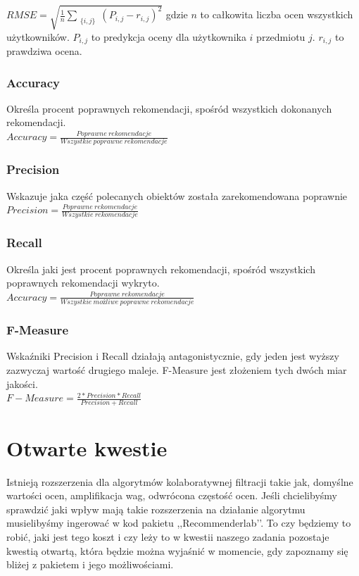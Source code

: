 \documentclass[12pt, a4paper]{article}
\begin{document}
\begin{math}
RMSE = \sqrt{
        \frac{1}{n} \sum_{ \substack{
                \{i,j\}
        } }
        (P_{i,j} - r_{i,j})^2
}
\end{math}
gdzie $n$ to całkowita liczba ocen wszystkich użytkowników. $P_{i,j}$ to predykcja oceny
dla użytkownika $i$ przedmiotu $j$. $r_{i,j}$ to prawdziwa ocena.

\subsubsection{Accuracy}
Określa procent poprawnych rekomendacji, spośród wszystkich dokonanych rekomendacji.\\
$Accuracy = \frac{Poprawne\:rekomendacje}{Wszystkie \:poprawne\: rekomendacje}$
\subsubsection{Precision}
Wskazuje jaka część polecanych obiektów została zarekomendowana poprawnie\\
$Precision = \frac{Poprawne \:rekomendacje}{Wszystkie\: rekomendacje}$
\subsubsection{Recall}
Określa jaki jest procent poprawnych rekomendacji, spośród wszystkich poprawnych rekomendacji wykryto.\\
$Accuracy = \frac{Poprawne\:rekomendacje}{Wszystkie \:możliwe \:poprawne\: rekomendacje}$
\subsubsection{F-Measure}
Wskaźniki Precision i Recall działają antagonistycznie, gdy jeden jest wyższy zazwyczaj wartość drugiego maleje. F-Measure jest złożeniem tych dwóch miar jakości.\\
$F-Measure = \frac{2*Precision*Recall}{Precision + Recall}$


\section{Otwarte kwestie}
Istnieją rozszerzenia dla algorytmów kolaboratywnej filtracji takie jak, domyślne wartości ocen, amplifikacja wag, odwrócona częstość ocen. Jeśli chcielibyśmy sprawdzić jaki wpływ mają takie rozszerzenia na działanie algorytmu musielibyśmy ingerować w kod pakietu ,,Recommenderlab’’. To czy będziemy to robić, jaki jest tego koszt i czy leży to w kwestii naszego zadania pozostaje kwestią otwartą, która będzie można wyjaśnić w momencie, gdy zapoznamy się bliżej z pakietem i jego możliwościami.
\end{document}
